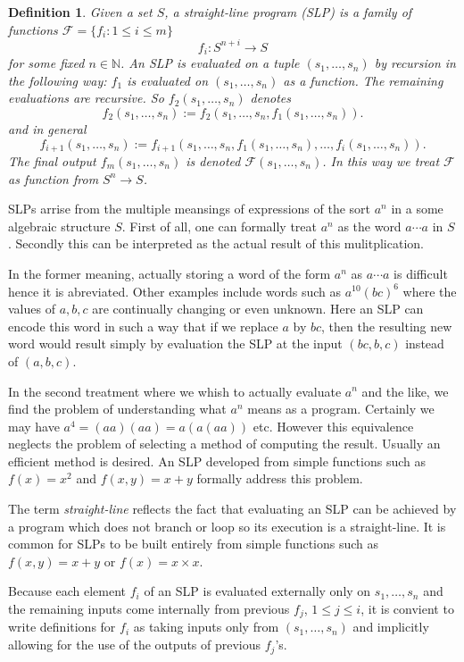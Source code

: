 \documentclass[12pt]{article}
\newtheorem{defn}[thm]{Definition}
\begin{document}
\begin{defn}
Given a set $S$, a \emph{straight-line program} (SLP) is a family of functions $\mathcal{F}=\{f_i:1\leq i\leq m\}$
\[f_{i}:S^{n+i}\rightarrow S\]
for some fixed $n\in\mathbb{N}$.  An SLP is \emph{evaluated} on a tuple
$(s_1,\dots,s_n)$ by recursion in the following way: $f_1$ is evaluated
on $(s_1,\dots,s_n)$ as a function.  The remaining evaluations are 
recursive.  So $f_2(s_1,\dots,s_n)$ denotes
\[f_2(s_1,\dots,s_n):=f_2(s_1,\dots,s_n,f_1(s_1,\dots,s_n)).\]
and in general 
\[f_{i+1}(s_1,\dots,s_n):=
f_{i+1}(s_1,\dots,s_n,f_1(s_1,\dots,s_n),\dots,f_i(s_1,\dots,s_n)).\]
The final output $f_m(s_1,\dots,s_n)$ is denoted $\mathcal{F}(s_1,\dots,s_n)$.
In this way we treat $\mathcal{F}$ as function from $S^n\rightarrow S$.
\end{defn}

SLPs arrise from the multiple meansings of expressions of the sort $a^n$
in a some algebraic structure $S$.  First of all, one can formally treat $a^n$ as the word $a\cdots a$ in $S$.  Secondly this can be interpreted as the actual result of this mulitplication.  

In the former meaning, actually storing a word of the form $a^n$ as 
$a\cdots a$ is difficult hence it is abreviated.  Other examples include
words such as $a^{10}(bc)^6$ where the values of $a,b,c$ are continually changing or even unknown.  Here an SLP can encode this word in such a way
that if we replace $a$ by $bc$, then the resulting new word would result
simply by evaluation the SLP at the input $(bc,b,c)$ instead of $(a,b,c)$.

In the second treatment where we whish to actually evaluate $a^n$ and the like,
we find the problem of understanding what $a^n$ means as a program.
Certainly we may have $a^4=(aa)(aa)=a(a(aa))$ etc.  However this equivalence 
neglects the problem of selecting a method of computing the result.  Usually
an efficient method is desired.   An SLP developed from simple functions
such as $f(x)=x^2$ and $f(x,y)=x+y$ formally address this problem.

The term \emph{straight-line} reflects the fact that evaluating an SLP can
be achieved by a program which does not branch or loop so its execution is
a straight-line.  It is common for SLPs to be built entirely from simple
functions such as $f(x,y)=x+y$ or $f(x)=x\times x$.

Because each element $f_i$ of an SLP is evaluated externally only on $s_1,\dots,s_n$ and the remaining inputs come internally from previous $f_j$,
$1\leq j\leq i$, it is convient to write definitions for $f_i$ as taking
inputs only from $(s_1,\dots,s_n)$ and implicitly allowing for the use of
the outputs of previous $f_j$'s.
\end{document}
